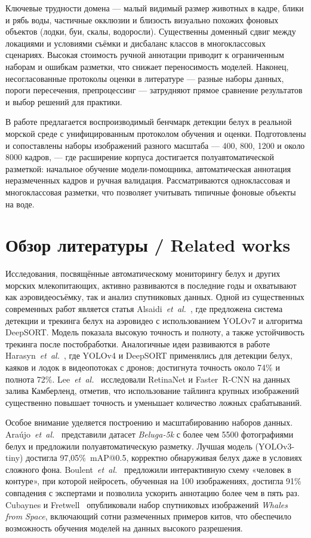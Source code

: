 \documentclass{article}
\begin{document}
Ключевые трудности домена — малый видимый размер животных в кадре, блики и рябь воды, частичные окклюзии и близость визуально похожих фоновых объектов (лодки, буи, скалы, водоросли). Существенны доменный сдвиг между локациями и условиями съёмки и дисбаланс классов в многоклассовых сценариях. Высокая стоимость ручной аннотации приводит к ограниченным наборам и ошибкам разметки, что снижает переносимость моделей. Наконец, несогласованные протоколы оценки в литературе — разные наборы данных, пороги пересечения, препроцессинг — затрудняют прямое сравнение результатов и выбор решений для практики.

В работе предлагается воспроизводимый бенчмарк детекции белух в реальной морской среде с унифицированным протоколом обучения и оценки. Подготовлены и сопоставлены наборы изображений разного масштаба — 400, 800, 1200 и около 8000 кадров, — где расширение корпуса достигается полуавтоматической разметкой: начальное обучение модели-помощника, автоматическая аннотация неразмеченных кадров и ручная валидация. Рассматриваются одноклассовая и многоклассовая разметки, что позволяет учитывать типичные фоновые объекты на воде.

\section{Обзор литературы / Related works}
Исследования, посвящённые автоматическому мониторингу белух и других морских млекопитающих, активно развиваются в последние годы и охватывают как аэровидеосъёмку, так и анализ спутниковых данных.
Одной из существенных современных работ является статья Alsaidi~\textit{et~al.}~\cite{alsaidi2024beluga_tracking}, где предложена система детекции и трекинга белух на аэровидео с использованием YOLOv7 и алгоритма DeepSORT. Модель показала высокую точность и полноту, а также устойчивость трекинга после постобработки. Аналогичные идеи развиваются в работе Harasyn~\textit{et~al.}~\cite{harasyn2022drone_beluga}, где YOLOv4 и DeepSORT применялись для детекции белух, каяков и лодок в видеопотоках с дронов; достигнута точность около 74\% и полнота 72\%.
Lee~\textit{et~al.}~\cite{lee2021beluga_retinanet} исследовали RetinaNet и Faster~R-CNN на данных залива Камберленд, отметив, что использование тайлинга крупных изображений существенно повышает точность и уменьшает количество ложных срабатываний.

Особое внимание уделяется построению и масштабированию наборов данных.
Araújo~\textit{et~al.}~\cite{araujo2022beluga_sensors} представили датасет \textit{Beluga-5k} с более чем 5500 фотографиями белух и предложили полуавтоматическую разметку. Лучшая модель (YOLOv3-tiny) достигла 97{,}05\%~mAP@0.5, корректно обнаруживая белух даже в условиях сложного фона.
Boulent~\textit{et~al.}~\cite{boulent2023humanloop} предложили интерактивную схему «человек в контуре», при которой нейросеть, обученная на 100 изображениях, достигла 91\% совпадения с экспертами и позволила ускорить аннотацию более чем в пять раз.
Cubaynes и Fretwell~\cite{cubaynes2022whales_dataset} опубликовали набор спутниковых изображений \textit{Whales from Space}, включающий сотни размеченных примеров китов, что обеспечило возможность обучения моделей на данных высокого разрешения.
\end{document}
